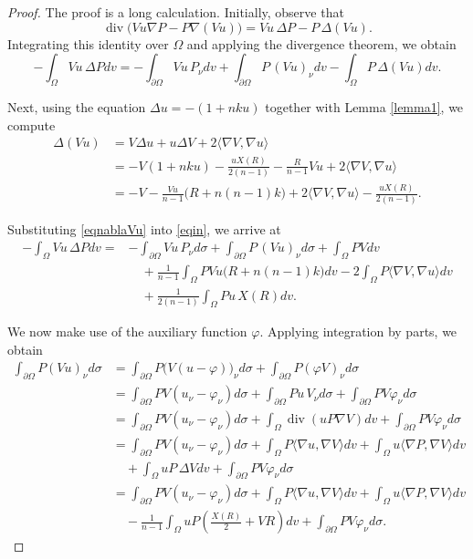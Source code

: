 \documentclass[10pt,a4paper]{amsart}
\begin{document}
\begin{proof} 
The proof is a long calculation.
Initially, observe that
\[
\operatorname{div}\bigl(Vu\nabla P-P\nabla(Vu)\bigr)
=
Vu\,\Delta P-P\,\Delta(Vu).
\]
Integrating this identity over \(\Omega\) and applying the divergence theorem, we obtain
\begin{equation}\label{eqin}
-\int_{\Omega}Vu\,\Delta Pdv
=
-\int_{\partial\Omega}Vu\,P_{\nu}dv
+\int_{\partial\Omega}P\,(Vu)_{\nu}dv
-\int_{\Omega}P\,\Delta(Vu)dv.
\end{equation}

Next, using the equation \(\Delta u=-(1+nku)\) together with Lemma \ref{lemma1}, we compute
\begin{align}\label{eqnablaVu}
\Delta(Vu)
&=
V\Delta u+u\Delta V+2\langle\nabla V,\nabla u\rangle \nonumber\\
&=
-V(1+nku)-\frac{uX(R)}{2(n-1)}-\frac{R}{n-1}Vu
+2\langle\nabla V,\nabla u\rangle \nonumber\\
&=
-V-\frac{Vu}{n-1}\bigl(R+n(n-1)k\bigr)
+2\langle\nabla V,\nabla u\rangle
-\frac{uX(R)}{2(n-1)}.
\end{align}

Substituting \eqref{eqnablaVu} into \eqref{eqin}, we arrive at
\begin{align}\label{eq43}
-\int_{\Omega}Vu\,\Delta Pdv
={}&
-\int_{\partial\Omega}Vu\,P_{\nu}d\sigma
+\int_{\partial\Omega}P\,(Vu)_{\nu}d\sigma
+\int_{\Omega}PVdv \nonumber\\
&\quad
+\frac{1}{n-1}\int_{\Omega}PVu\bigl(R+n(n-1)k\bigr)dv
-2\int_{\Omega}P\langle \nabla V,\nabla u\rangle dv\nonumber\\
&\quad
+\frac{1}{2(n-1)}\int_{\Omega}Pu\,X(R)dv.
\end{align}

We now make use of the auxiliary function \(\varphi\). Applying integration by parts, we obtain
\begin{align}\label{eq44}
\int_{\partial\Omega}P(Vu)_{\nu}d\sigma
&=
\int_{\partial\Omega}P\bigl(V(u-\varphi)\bigr)_{\nu}d\sigma
+
\int_{\partial\Omega}P(\varphi V)_{\nu}d\sigma
\nonumber\\
&=
\int_{\partial\Omega}PV(u_{\nu}-\varphi_{\nu})d\sigma
+
\int_{\partial\Omega}Pu\,V_{\nu}d\sigma
+
\int_{\partial\Omega}PV\varphi_{\nu}d\sigma
\nonumber\\
&=
\int_{\partial\Omega}PV(u_{\nu}-\varphi_{\nu})d\sigma
+
\int_{\Omega}\operatorname{div}(uP\nabla V)dv
+
\int_{\partial\Omega}PV\varphi_{\nu}d\sigma
\nonumber\\
&=
\int_{\partial\Omega}PV(u_{\nu}-\varphi_{\nu})d\sigma
+
\int_{\Omega}P\langle\nabla u,\nabla V\rangle dv
+
\int_{\Omega}u\langle\nabla P,\nabla V\rangle dv
\nonumber\\
&\quad
+
\int_{\Omega}uP\,\Delta Vdv
+
\int_{\partial\Omega}PV\varphi_{\nu}d\sigma
\nonumber\\
&=
\int_{\partial\Omega}PV(u_{\nu}-\varphi_{\nu})d\sigma
+
\int_{\Omega}P\langle\nabla u,\nabla V\rangle dv
+
\int_{\Omega}u\langle\nabla P,\nabla V\rangle dv
\nonumber\\
&\quad
-
\frac{1}{n-1}
\int_{\Omega}uP\left(\frac{X(R)}{2}+VR\right)dv
+
\int_{\partial\Omega}PV\varphi_{\nu}d\sigma.
\end{align}


\end{proof}
\end{document}
